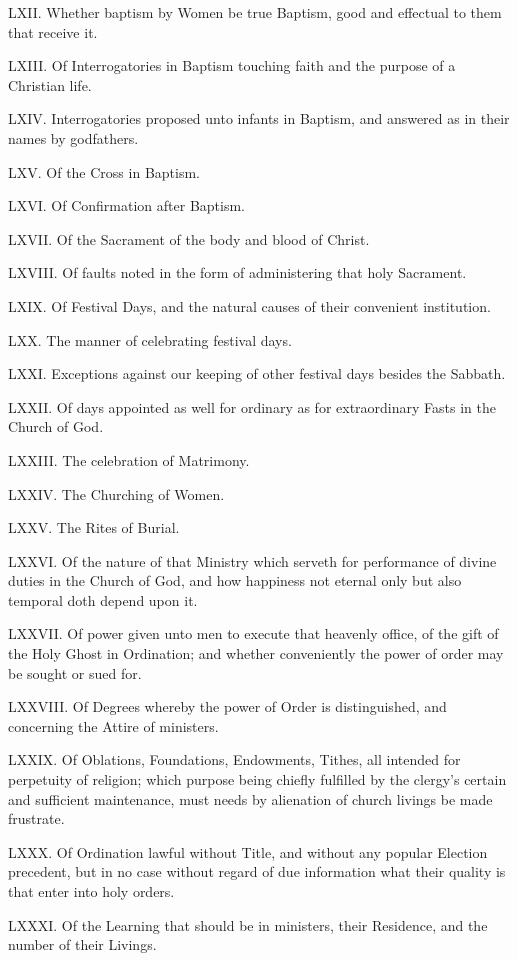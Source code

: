 LXII. Whether baptism by Women be true Baptism, good and effectual to them that receive it.

LXIII. Of Interrogatories in Baptism touching faith and the purpose of a Christian life.

LXIV. Interrogatories proposed unto infants in Baptism, and answered as in their names by godfathers.

LXV. Of the Cross in Baptism.

LXVI. Of Confirmation after Baptism.

LXVII. Of the Sacrament of the body and blood of Christ.

LXVIII. Of faults noted in the form of administering that holy Sacrament.

LXIX. Of Festival Days, and the natural causes of their convenient institution.

LXX. The manner of celebrating festival days.

LXXI. Exceptions against our keeping of other festival days besides the Sabbath.

LXXII. Of days appointed as well for ordinary as for extraordinary Fasts in the Church of God.

LXXIII. The celebration of Matrimony.

LXXIV. The Churching of Women.

LXXV. The Rites of Burial.

LXXVI. Of the nature of that Ministry which serveth for performance of divine duties in the Church of God, and how happiness not eternal only but also temporal doth depend upon it.

LXXVII. Of power given unto men to execute that heavenly office, of the gift of the Holy Ghost in Ordination; and whether conveniently the power of order may be sought or sued for.  

LXXVIII. Of Degrees whereby the power of Order is distinguished, and concerning the Attire of ministers.

LXXIX. Of Oblations, Foundations, Endowments, Tithes, all intended for perpetuity of religion; which purpose being chiefly fulfilled by the clergy’s certain and sufficient maintenance, must needs by alienation of church livings be made frustrate.

LXXX. Of Ordination lawful without Title, and without any popular Election precedent, but in no case without regard of due information what their quality is that enter into holy orders.

LXXXI. Of the Learning that should be in ministers, their Residence, and the number of their Livings.



